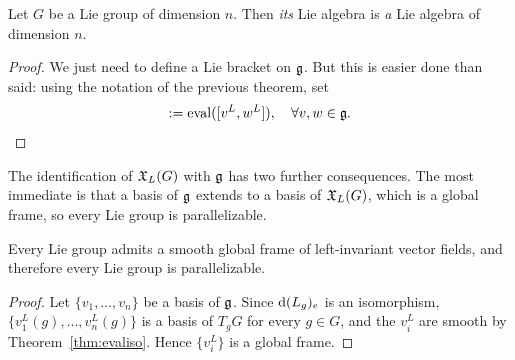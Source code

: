 \begin{corollary}
	Let $G$ be a Lie group of dimension $n$.
	Then \emph{its} Lie algebra is \emph{a} Lie algebra of dimension $n$.
\end{corollary}
\begin{proof}
	We just need to define a Lie bracket on $\mathfrak{g}$.
	But this is easier done than said: using the notation of the previous theorem, set
	\begin{equation}
		[v,w] := \mathrm{eval}([v^L, w^L]), \quad \forall v,w\in\fg.
	\end{equation}
\end{proof}

The identification of $\mathfrak{X}_L(G)$ with $\mathfrak{g}$ has two further consequences.
The most immediate is that a basis of $\mathfrak{g}$ extends to a basis of $\mathfrak{X}_L(G)$, which is a global frame, so every Lie group is parallelizable.

\begin{corollary}\label{cor:LGparallel}
	Every Lie group admits a smooth global frame of left-invariant vector fields, and therefore every Lie group is parallelizable.
\end{corollary}
\begin{proof}
	Let $\{v_1,\ldots,v_n\}$ be a basis of $\mathfrak{g}$. Since $\operatorname{d}(L_g)_e$ is an isomorphism, $\{v_1^L(g),\ldots,v_n^L(g)\}$ is a basis of $T_gG$ for every $g\in G$, and the $v_i^L$ are smooth by Theorem~\ref{thm:evaliso}. Hence $\{v_i^L\}$ is a global frame.
\end{proof}

